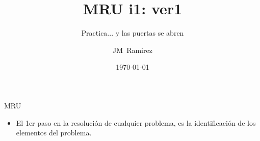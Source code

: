 \documentclass{beamer}
\title{MRU i1: ver1}
\subtitle{Practica... y las puertas se abren}
\author{JM~Ramirez}
\date{\today}
\begin{document}
\maketitle




\begin{frame}{MRU}
% 
 


 
\begin{itemize}                                                              

\item El 1er paso en la resoluci\'on de cualquier problema, es la
identificaci\'on de los elementos del problema.            
              
\end{itemize}

\end{frame}
\end{document}

